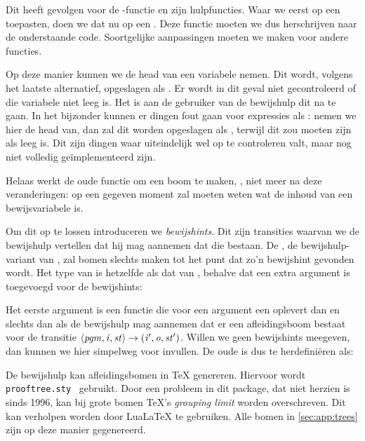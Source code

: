 Dit heeft gevolgen voor de -functie en zijn hulpfuncties. Waar we
eerst  op een  toepasten, doen we dat nu op een .
Deze functie moeten we dus herschrijven naar de onderstaande code. Soortgelijke
aanpassingen moeten we maken voor andere functies.



Op deze manier kunnen we de head van een variabele nemen. Dit wordt, volgens
het laatste alternatief, opgeslagen als . Er wordt in dit
geval niet gecontroleerd of die variabele niet leeg is. Het is aan de gebruiker
van de bewijshulp dit na te gaan. In het bijzonder kunnen er dingen fout gaan
voor expressies als : nemen we hier de head van,
dan zal dit worden opgeslagen als , terwijl dit  zou moeten zijn als  leeg is. Dit zijn dingen waar uiteindelijk wel
op te controleren valt, maar nog niet volledig geïmplementeerd zijn.

Helaas werkt de oude functie om een boom te maken, , niet meer na deze
veranderingen: op een gegeven moment zal  moeten weten wat de inhoud
van een bewijsvariabele is.

Om dit op te lossen introduceren we \emph{bewijshints}. Dit zijn transities
waarvan we de bewijshulp vertellen dat hij mag aannemen dat die bestaan. De
, de bewijshulp-variant van , zal bomen slechts maken tot
het punt dat zo'n bewijshint gevonden wordt. Het type van  is
hetzelfde als dat van , behalve dat een extra argument is toegevoegd
voor de bewijshints:



Het eerste argument is een functie die voor een argument  een
 oplevert dan en slechts dan als de bewijshulp mag aannemen
dat er een afleidingsboom bestaat voor de transitie
$\left\langle\mathit{pgm},\mathit{i},\mathit{st}\right\rangle\to\left(\mathit{i}',\mathit{o},\mathit{st}'\right)$. Willen we geen bewijshints meegeven, dan
kunnen we hier simpelweg  voor invullen. De oude 
is dus te herdefiniëren als:



De bewijshulp kan afleidingsbomen in \TeX{} genereren. Hiervoor wordt
\texttt{prooftree.sty}~\cite{prooftree} gebruikt. Door een probleem in dit
package, dat niet herzien is sinds 1996, kan bij grote bomen \TeX{}'s
\emph{grouping limit} worden overschreven. Dit kan verholpen worden door
LuaLaTeX te gebruiken. Alle bomen in \autoref{sec:app:trees} zijn op deze
manier gegenereerd.
